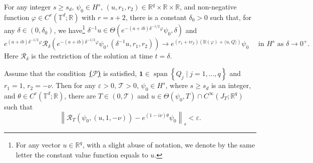 \documentclass[10pt,a4paper]{amsart}
\def \geq{\geqslant}
\def\R {\mathbb{R}}
\begin{document}
\begin{proposition}\label{prop1.2}
For any integer $s \geq s_d,\, \psi_0 \in H^s,\, (u,r_1,r_2) \in \mathbb{R}^q\times\R\times\R$, and  non-negative function $\varphi \in C^r\left(\mathbb{T}^d ; \mathbb{R}\right)$ with $r=s+2$, there is a constant $\delta_0>0$ such that, for any $\delta \in\left(0, \delta_0\right)$, we have\footnote{For any vector $u \in \mathbb{R}^q$, with a slight abuse of notation, we denote by the same letter the constant value function equals to $u$.} $\delta^{-1} u \in \Theta\left(e^{-(a+ib) \delta^{-1 / 2} \varphi} \psi_0, \delta\right)$ and
\begin{equation*}\label{(1.3)}
e^{ (a+ib)\delta^{-1 / 2} \varphi} \mathcal{R}_\delta\left(e^{-(a+ib) \delta^{-1 / 2} \varphi} \psi_0, (\delta^{-1} u,r_1,r_2)\right) \rightarrow e^{(r_1+i r_2)\left( \mathbb{B}(\varphi)+\langle u, Q\rangle\right)} \psi_0 \quad \text { in } H^s \text { as } \delta \rightarrow 0^{+}.
\end{equation*}
Here $\mathcal{R}_\delta$ is the restriction of the solution at time $t=\delta$.
\end{proposition}

\begin{theorem}\label{thm2.2}
Assume that the condition~{\hyperlink{H1}{\textbf{($\mathscr{P}$)}}} is satisfied, $ \mathbf{1}\in \operatorname{span}\left\{Q_j\mid j=1, \ldots, q\right\} $ and $ r_1=1,\, r_2=-\nu $.
Then for any $\varepsilon>0,\, \mathcal{T}>0,\, \psi_0 \in H^s$, where $s \geq s_d$ is an integer, and $\theta \in C^r\left(\mathbb{T}^d ; \mathbb{R}\right)$, there are $T \in(0, \mathcal{T})$ and $u \in \Theta\left(\psi_0, T\right) \cap C^{\infty}\left(J_T ; \mathbb{R}^q\right)$ such that
\begin{equation}\label{(2.2)}
\left\|\mathcal{R}_T\left(\psi_0, (u,1,-\nu)\right)-e^{(1-i\nu) \theta} \psi_0\right\|_s<\varepsilon.
\end{equation}
\end{theorem}
\end{document}
